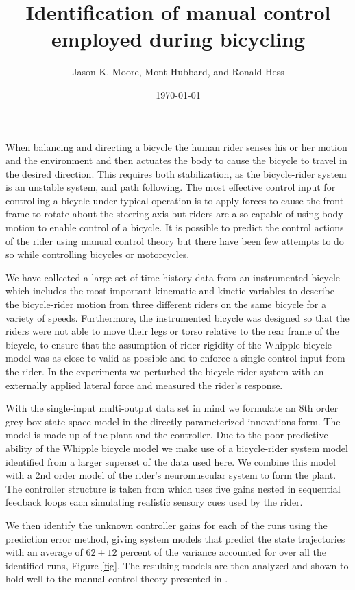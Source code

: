 \documentclass[a4paper]{article}
\title{Identification of manual control employed during bicycling}
\author{Jason K. Moore, Mont Hubbard, and Ronald Hess}
\date{\today}
\begin{document}
\maketitle

When balancing and directing a bicycle the human rider senses his or her motion
and the environment and then actuates the body to cause the bicycle to travel
in the desired direction. This requires both stabilization, as the
bicycle-rider system is an unstable system, and path following. The most
effective control input for controlling a bicycle under typical operation is to
apply forces to cause the front frame to rotate about the steering axis but
riders are also capable of using body motion to enable control of a bicycle.
It is possible to predict the control actions of the rider using manual control
theory but there have been few attempts to do so while controlling bicycles or
motorcycles.

We have collected a large set of time history data from an instrumented bicycle
which includes the most important kinematic and kinetic variables to describe
the bicycle-rider motion from three different riders on the same bicycle for a
variety of speeds. Furthermore, the instrumented bicycle was designed so that
the riders were not able to move their legs or torso relative to the rear frame
of the bicycle, to ensure that the assumption of rider rigidity of the Whipple
bicycle model was as close to valid as possible and to enforce a single control
input from the rider. In the experiments we perturbed the bicycle-rider system
with an externally applied lateral force and measured the rider's response.

With the single-input multi-output data set in mind we formulate an 8th order
grey box state space model \cite{Ljung1998} in the directly parameterized
innovations form. The model is made up of the plant and the controller. Due to
the poor predictive ability of the Whipple bicycle model we make use of a
bicycle-rider system model identified from a larger superset of the data used
here. We combine this model with a 2nd order model of the rider's neuromuscular
system to form the plant. The controller structure is taken from
\cite{Hess2012} which uses five gains nested in sequential feedback loops each
simulating realistic sensory cues used by the rider.

We then identify the unknown controller gains for each of the runs using the
prediction error method, giving system models that predict the state
trajectories with an average of $62 \pm 12$ percent of the variance accounted
for over all the identified runs, Figure \ref{fig}. The resulting models are
then analyzed and shown to hold well to the manual control theory presented in
\cite{Hess2012}.
\end{document}
